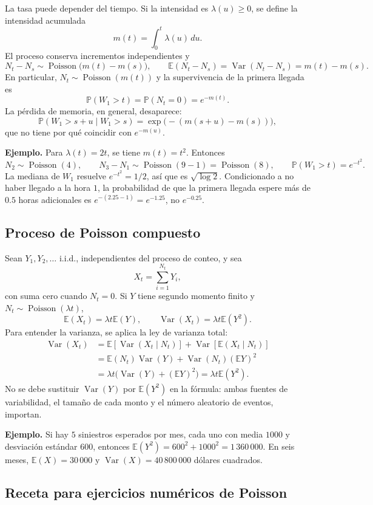 \documentclass[11pt,oneside]{article}
\newcommand{\E}{\mathbb{E}}
\newcommand{\Prob}{\mathbb{P}}
\newcommand{\Var}{\operatorname{Var}}
\newcommand{\Pois}{\operatorname{Poisson}}
\newcommand{\1}{\mathbf{1}}
\begin{document}
La tasa puede depender del tiempo. Si la intensidad es $\lambda(u)\geq0$, se define la intensidad acumulada
\[
m(t)=\int_0^t\lambda(u)\,du.
\]
El proceso conserva incrementos independientes y
\[
N_t-N_s\sim\Pois\bigl(m(t)-m(s)\bigr),\qquad
\E(N_t-N_s)=\Var(N_t-N_s)=m(t)-m(s).
\]
En particular, $N_t\sim\Pois(m(t))$ y la supervivencia de la primera llegada es
\[
\Prob(W_1>t)=\Prob(N_t=0)=e^{-m(t)}.
\]
La pérdida de memoria, en general, desaparece:
\[
\Prob(W_1>s+u\mid W_1>s)
 =\exp\bigl(-(m(s+u)-m(s))\bigr),
\]
que no tiene por qué coincidir con $e^{-m(u)}$.

\textbf{Ejemplo.} Para $\lambda(t)=2t$, se tiene $m(t)=t^2$. Entonces
\[
N_2\sim\Pois(4),\qquad
N_3-N_1\sim\Pois(9-1)=\Pois(8),\qquad
\Prob(W_1>t)=e^{-t^2}.
\]
La mediana de $W_1$ resuelve $e^{-t^2}=1/2$, así que es $\sqrt{\log 2}$. Condicionado a no haber llegado a la hora $1$, la probabilidad de que la primera llegada espere más de $0.5$ horas adicionales es $e^{-(2.25-1)}=e^{-1.25}$, no $e^{-0.25}$.

\subsection{Proceso de Poisson compuesto}

Sean $Y_1,Y_2,\ldots$ i.i.d., independientes del proceso de conteo, y sea
\[
X_t=\sum_{i=1}^{N_t}Y_i,
\]
con suma cero cuando $N_t=0$. Si $Y$ tiene segundo momento finito y $N_t\sim\Pois(\lambda t)$,
\[
\boxed{\E(X_t)=\lambda t\E(Y),\qquad
\Var(X_t)=\lambda t\E(Y^2).}
\]
Para entender la varianza, se aplica la ley de varianza total:
\begin{align*}
\Var(X_t)
&=\E[\Var(X_t\mid N_t)]+\Var[\E(X_t\mid N_t)]\\
&=\E(N_t)\Var(Y)+\Var(N_t)(\E Y)^2\\
&=\lambda t\bigl(\Var(Y)+(\E Y)^2\bigr)
 =\lambda t\E(Y^2).
\end{align*}
No se debe sustituir $\Var(Y)$ por $\E(Y^2)$ en la fórmula: ambas fuentes de variabilidad, el tamaño de cada monto y el número aleatorio de eventos, importan.

\textbf{Ejemplo.} Si hay $5$ siniestros esperados por mes, cada uno con media $1000$ y desviación estándar $600$, entonces $\E(Y^2)=600^2+1000^2=1\,360\,000$. En seis meses, $\E(X)=30\,000$ y $\Var(X)=40\,800\,000$ dólares cuadrados.

\subsection{Receta para ejercicios numéricos de Poisson}
\end{document}
